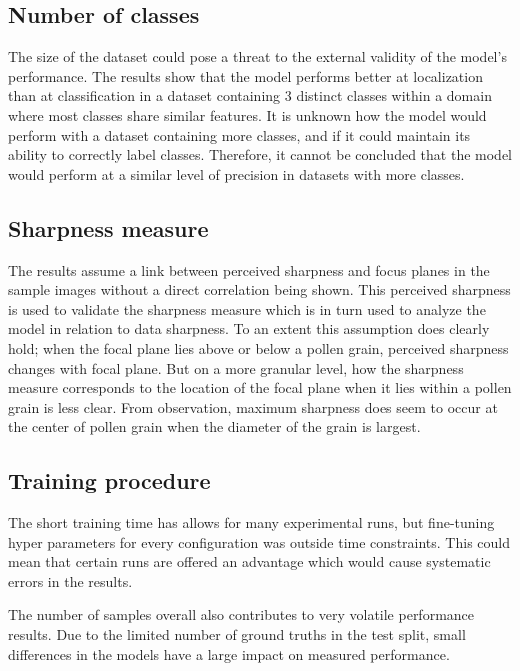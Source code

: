 \subsection{Number of classes}
The size of the dataset could pose a threat to the external validity of the model's performance.
The results show that the model performs better at localization than at classification in a dataset containing 3 distinct classes within a domain where most classes share similar features.
It is unknown how the model would perform with a dataset containing more classes, and if it could maintain its ability to correctly label classes.
Therefore, it cannot be concluded that the model would perform at a similar level of precision in datasets with more classes.

\subsection{Sharpness measure}
The results assume a link between perceived sharpness and focus planes in the sample images without a direct correlation being shown.
This perceived sharpness is used to validate the sharpness measure which is in turn used to analyze the model in relation to data sharpness.
To an extent this assumption does clearly hold; when the focal plane lies above or below a pollen grain, perceived sharpness changes with focal plane.
But on a more granular level, how the sharpness measure corresponds to the location of the focal plane when it lies within a pollen grain is less clear.
From observation, maximum sharpness does seem to occur at the center of pollen grain when the diameter of the grain is largest.

\subsection{Training procedure}
The short training time has allows for many experimental runs, but fine-tuning hyper parameters for every configuration was outside time constraints.
This could mean that certain runs are offered an advantage which would cause systematic errors in the results.

The number of samples overall also contributes to very volatile performance results.
Due to the limited number of ground truths in the test split, small differences in the models have a large impact on measured performance.
